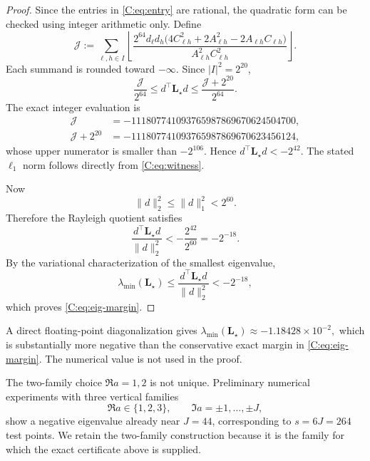 \begin{proof}
Since the entries in \eqref{C:eq:entry} are rational, the quadratic
form can be checked using integer arithmetic only.  Define
\[
 \mathcal J
 :=
 \sum_{\ell,h\in I}
 \left\lfloor
 \frac{2^{64}d_\ell d_h
 \bigl(4C_{\ell h}^2+2A_{\ell h}^2
       -2A_{\ell h}C_{\ell h}\bigr)}
 {A_{\ell h}^2C_{\ell h}^2}
 \right\rfloor.
\]
Each summand is rounded toward $-\infty$.  Since $|I|^2=2^{20}$,
\[
 \frac{\mathcal J}{2^{64}}
 \le d^\top\mathbf L_\star d
 \le \frac{\mathcal J+2^{20}}{2^{64}}.
\]
The exact integer evaluation is
\[
\begin{aligned}
 \mathcal J
 &=-111807741093765987869670624504700,\\
 \mathcal J+2^{20}
 &=-111807741093765987869670623456124,
\end{aligned}
\]
whose upper numerator is smaller than $-2^{106}$.  Hence
$d^\top\mathbf L_\star d<-2^{42}$.  The stated $\ell_1$ norm follows
directly from \eqref{C:eq:witness}.

Now
\[
 \|d\|_2^2\le\|d\|_1^2<2^{60}.
\]
Therefore the Rayleigh quotient satisfies
\[
 \frac{d^\top\mathbf L_\star d}{\|d\|_2^2}
 <-\frac{2^{42}}{2^{60}}
 =-2^{-18}.
\]
By the variational characterization of the smallest eigenvalue,
\[
 \lambda_{\min}(\mathbf L_\star)
 \le
 \frac{d^\top\mathbf L_\star d}{\|d\|_2^2}
 <-2^{-18},
\]
which proves \eqref{C:eq:eig-margin}.
\end{proof}

\begin{remark}
A direct floating-point diagonalization gives
$
\lambda_{\min}(\mathbf L_\star)\approx-1.18428\times10^{-2},
$
which is substantially more negative than the conservative exact
margin in \eqref{C:eq:eig-margin}.  The numerical value is not used in
the proof.
\end{remark}

\begin{remark}
\label{C:rem:alternative-test-families}
The two-family choice $\Re a=1,2$ is not unique.  Preliminary numerical
experiments with three vertical families
\[
 \Re a\in\{1,2,3\},\qquad
 \Im a=\pm1,\ldots,\pm J,
\]
show a negative eigenvalue already near $J=44$, corresponding to
$s=6J=264$ test points.  We retain the two-family construction because
it is the family for which the exact certificate above is supplied.
\end{remark}
